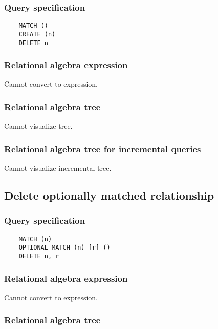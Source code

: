 	\subsubsection*{Query specification}

	\begin{lstlisting}
	MATCH ()
	CREATE (n)
	DELETE n
	\end{lstlisting}


	\subsubsection*{Relational algebra expression}

	Cannot convert to expression.

	\subsubsection*{Relational algebra tree}

	Cannot visualize tree.

	\subsubsection*{Relational algebra tree for incremental queries}

	Cannot visualize incremental tree.
	\subsection{Delete optionally matched relationship}

	\subsubsection*{Query specification}

	\begin{lstlisting}
	MATCH (n)
	OPTIONAL MATCH (n)-[r]-()
	DELETE n, r
	\end{lstlisting}


	\subsubsection*{Relational algebra expression}

	Cannot convert to expression.

	\subsubsection*{Relational algebra tree}

